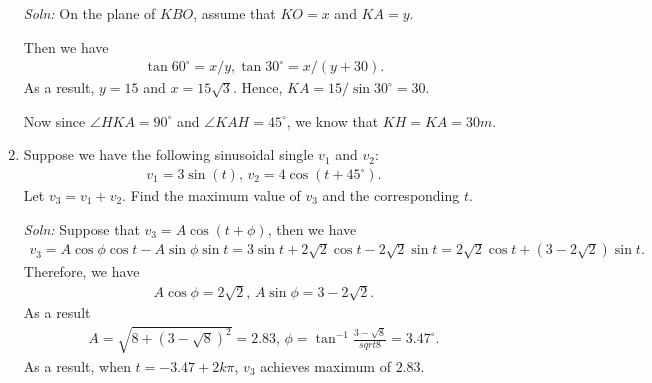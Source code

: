 \documentclass{article}
\begin{document}
\begin{enumerate}
   \begin{figure}[h]
    \centering
  \end{figure}

\emph{Soln:} On the plane of $KBO$, assume that $KO = x$ and $KA = y$. 
   \begin{figure}[h]
    \centering
  \end{figure}
Then we have
\begin{align*}
  \tan 60^\circ = x/y,\tan 30^\circ = x/(y+30).
\end{align*}
As a result, $y = 15$ and $x = 15\sqrt{3}$. Hence, $KA = 15/\sin 30^\circ = 30$.

Now since $\angle HKA=90^\circ$ and $\angle KAH = 45^\circ$, we know that $KH = KA = 30m$.
\newpage

 
\item Suppose we have the following sinusoidal single $v_1$ and $v_2$:
\begin{align*}
  v_1 = 3\sin(t),\,v_2 = 4\cos(t+45^\circ).
\end{align*}
Let $v_3 = v_1 + v_2$. Find the maximum value of $v_3$ and the corresponding $t$.

\emph{Soln:} Suppose that $v_3 = A \cos(t + \phi)$, then we have
\begin{align*}
  v_3 = A\cos \phi \cos t - A \sin \phi \sin t = 3\sin t+ 2\sqrt{2}\cos t - 2\sqrt{2} \sin t = 2\sqrt{2}\cos t + (3-2\sqrt{2})\sin t.
\end{align*}
Therefore, we have
\begin{align*}
  A\cos \phi = 2\sqrt{2},\,A\sin \phi = 3-2\sqrt{2}.
\end{align*}
As a result
\begin{align*}
  A = \sqrt{8+(3-\sqrt{8})^2}=2.83,\,\phi = \tan^{-1}\frac{3-\sqrt{8}}{sqrt{8}} = 3.47^\circ.
\end{align*}
As a result, when $t = -3.47+2k\pi$, $v_3$ achieves maximum of $2.83$.
 
\end{enumerate}
\end{document}
